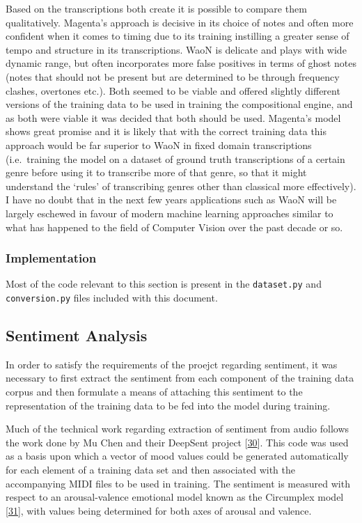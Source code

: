 \documentclass[12pt,]{article}
\begin{document}
Based on the transcriptions both create it is possible to compare them
qualitatively. Magenta's approach is decisive in its choice of notes and
often more confident when it comes to timing due to its training
instilling a greater sense of tempo and structure in its transcriptions.
WaoN is delicate and plays with wide dynamic range, but often
incorporates more false positives in terms of ghost notes (notes that
should not be present but are determined to be through frequency
clashes, overtones etc.). Both seemed to be viable and offered slightly
different versions of the training data to be used in training the
compositional engine, and as both were viable it was decided that both
should be used. Magenta's model shows great promise and it is likely
that with the correct training data this approach would be far superior
to WaoN in fixed domain transcriptions (i.e.~training the model on a
dataset of ground truth transcriptions of a certain genre before using
it to transcribe more of that genre, so that it might understand the
`rules' of transcribing genres other than classical more effectively). I
have no doubt that in the next few years applications such as WaoN will
be largely eschewed in favour of modern machine learning approaches
similar to what has happened to the field of Computer Vision over the
past decade or so.

\hypertarget{implementation}{%
\subsubsection{Implementation}\label{implementation}}

Most of the code relevant to this section is present in the
\texttt{dataset.py} and \texttt{conversion.py} files included with this
document.

\hypertarget{sentiment-analysis}{%
\subsection{Sentiment Analysis}\label{sentiment-analysis}}

In order to satisfy the requirements of the proejct regarding sentiment,
it was necessary to first extract the sentiment from each component of
the training data corpus and then formulate a means of attaching this
sentiment to the representation of the training data to be fed into the
model during training.

Much of the technical work regarding extraction of sentiment from audio
follows the work done by Mu Chen and their DeepSent project
{[}\protect\hyperlink{ref-deepsent}{30}{]}. This code was used as a
basis upon which a vector of mood values could be generated
automatically for each element of a training data set and then
associated with the accompanying MIDI files to be used in training. The
sentiment is measured with respect to an arousal-valence emotional model
known as the Circumplex model
{[}\protect\hyperlink{ref-russell1980circumplex}{31}{]}, with values
being determined for both axes of arousal and valence.
\end{document}
